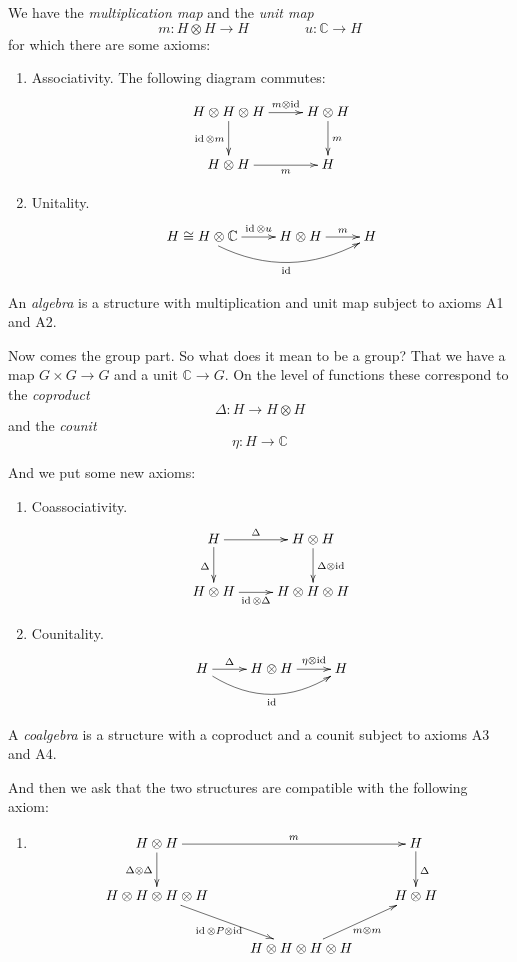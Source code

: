 We have the {\it multiplication map} and
the {\it unit map}
$$
m:H\otimes H\to H
\qquad\qquad
u:\mathbb{C}\to H
$$
for which there are some axioms:
\begin{enumerate}
\item[{\bf A1}] Associativity. The
following diagram commutes:
$$
\xymatrix{
H\otimes H\otimes H
\ar[r]^-{m\otimes\operatorname{id}}
\ar[d]_{\operatorname{id}\otimes m}
& H\otimes H \ar[d]^{m}\\
H\otimes H \ar[r]_-{m} & H
}
$$
\item[{\bf A2}] Unitality.
$$
\xymatrix{
H\cong H\otimes\mathbb{C}
\ar[r]^-{\operatorname{id}\otimes u}
\ar@/_1.5pc/[rr]_{\operatorname{id}}
& H\otimes H \ar[r]^-{m} & H
}
$$
\end{enumerate}

\begin{definition}
\label{definition-l1-algebra}
An {\it algebra} is a structure with
multiplication and unit map subject to
axioms A1 and A2.
\end{definition}

Now comes the group part. So what does it
mean to be a group? That we have a map
$G\times G\to G$ and a unit
$\mathbb{C}\to G$. On the level of
functions these correspond to the
{\it coproduct}
$$
\Delta:H\to H\otimes H
$$
and the {\it counit}
$$
\eta:H\to \mathbb{C}
$$

And we put some new axioms:
\begin{enumerate}
\item[{\bf A3}] Coassociativity.
$$
\xymatrix{
H \ar[r]^-{\Delta} \ar[d]_{\Delta}
& H\otimes H
\ar[d]^{\Delta\otimes\operatorname{id}}\\
H\otimes H
\ar[r]_-{\operatorname{id}\otimes\Delta}
& H\otimes H\otimes H
}
$$
\item[{\bf A4}] Counitality.
$$
\xymatrix{
H \ar[r]^-{\Delta}
\ar@/_1.5pc/[rr]_{\operatorname{id}}
& H\otimes H
\ar[r]^-{\eta\otimes\operatorname{id}} & H
}
$$
\end{enumerate}

\begin{definition}
\label{definition-l1-coalgebra}
A {\it coalgebra} is a structure with a
coproduct and a counit subject to
axioms A3 and A4.
\end{definition}

And then we ask that the two structures
are compatible with the following axiom:
\begin{enumerate}
\item[{\bf A5}]
$$
\xymatrix{
H\otimes H \ar[rr]^-{m}
\ar[d]_{\Delta\otimes\Delta}
&& H \ar[d]^{\Delta}\\
H\otimes H\otimes H\otimes H
\ar[dr]_{\operatorname{id}\otimes P
\otimes\operatorname{id}}
&& H\otimes H\\
& H\otimes H\otimes H\otimes H
\ar[ur]_{m\otimes m}
}
$$
\end{enumerate}

